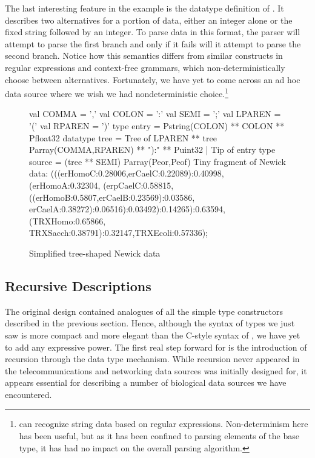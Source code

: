 The last interesting feature in the \dibbler{} example is the
datatype definition of .  It describes
two alternatives for a portion of data, either an integer alone
or the fixed string  followed by an integer.
To parse data in this format, the parser will
attempt to parse the first branch and only if it
fails will it attempt to parse the second branch.
Notice how this semantics differs from similar constructs in
regular expressions and context-free grammars, which
non-deterministically choose between alternatives.
Fortunately, we have yet to come across an ad hoc data source
where we wish we had nondeterministic choice.\footnote{\pads{}
can recognize string data based on regular expressions.
Non-determinism here has been useful, but as it
has been confined to parsing elements of the  
base type, it has had no impact on the overall parsing 
algorithm.}

\begin{figure}
\begin{code}
val COMMA  = ','
val COLON  = ':'
val SEMI   = ';'
val LPAREN = '('
val RPAREN = ')'
\mbox{}
type entry = Pstring(COLON) ** COLON ** Pfloat32
\mbox{}
datatype tree =
    Tree of LPAREN ** tree Parray(COMMA,RPAREN) ** "):" ** Puint32
  | Tip of entry
\mbox{}
type source = (tree ** SEMI) Parray(Peor,Peof)
\mbox{}
{\rm Tiny fragment of Newick data:} 
\mbox{}
(((erHomoC:0.28006,erCaelC:0.22089):0.40998,(erHomoA:0.32304,
(erpCaelC:0.58815,((erHomoB:0.5807,erCaelB:0.23569):0.03586,
erCaelA:0.38272):0.06516):0.03492):0.14265):0.63594,(TRXHomo:0.65866,
TRXSacch:0.38791):0.32147,TRXEcoli:0.57336);
\end{code}
\caption{Simplified tree-shaped Newick data}
\label{fig:newick}
\end{figure}

\subsection{Recursive Descriptions}

The original \pads{} design contained analogues of all the 
simple type constructors described in the previous section.
Hence, although the syntax of types we just saw
is more compact and more elegant than the C-style syntax 
of \pads, we have yet to add any expressive power. 
The first real step forward for \datatype{} is the introduction
of recursion through the data type mechanism.  While
recursion never appeared in the telecommunications and 
networking data sources \pads{} was initially designed for, it
appears essential for describing a number of biological
data sources we have encountered.
  
